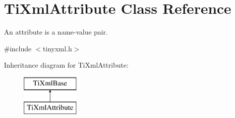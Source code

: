 \hypertarget{class_ti_xml_attribute}{
\section{TiXmlAttribute Class Reference}
\label{class_ti_xml_attribute}
}


An attribute is a name-\/value pair.  




{\ttfamily \#include $<$tinyxml.h$>$}

Inheritance diagram for TiXmlAttribute:\begin{figure}[H]
\begin{center}
\leavevmode
\includegraphics[height=2.000000cm]{class_ti_xml_attribute}
\end{center}
\end{figure}
